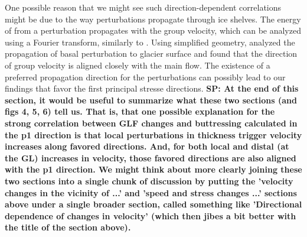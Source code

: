 \documentclass[review,oneside]{igs}
\begin{document}
One possible reason that we might see such direction-dependent correlations might be due to the way perturbations propagate through ice shelves. The energy of from a perturbation propagates with the group velocity, which can be analyzed using a Fourier transform, similarly to \citet{gudmundsson2003}. Using simplified geometry, \citet{gudmundsson2003} analyzed the propagation of basal perturbation to glacier surface and found that the direction of group velocity is aligned closely with the main flow. The existence of a preferred propagation direction for the perturbations can possibly lead to our findings that favor the first principal stresse directions. 
\textbf{SP: At the end of this section, it would be useful to summarize what these two sections (and figs 4, 5, 6) tell us. That is, that one possible explanation for the strong correlation between GLF changes and buttressing calculated in the p1 direction is that local perturbations in thickness trigger velocity increases along favored directions. And, for both local and distal (at the GL) increases in velocity, those favored directions are also aligned with the p1 direction. We might think about more clearly joining these two sections into a single chunk of discussion by putting the 'velocity changes in the vicinity of ...' and 'speed and stress changes ...' sections above under a single broader section, called something like 'Directional dependence of changes in velocity' (which then jibes a bit better with the title of the section above).}

\end{document}

